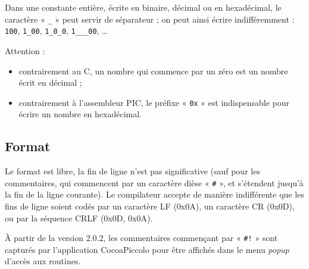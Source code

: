Dans une constante entière, écrite en binaire, décimal ou en hexadécimal, le caractère « \texttt{\_} » peut servir de séparateur ; on peut ainsi écrire indifféremment : \texttt{100}, \texttt{1\_00}, \texttt{1\_0\_0}, \texttt{1\_\_\_00}, \dots

Attention :
\begin{itemize}
  \item contrairement au C, un nombre qui commence par un zéro est un nombre écrit en décimal ;
  \item contrairement à l’assembleur PIC, le préfixe « \texttt{0x} » est indispensable pour écrire un nombre en hexadécimal.
\end{itemize}

\subsection{Format}

Le format est libre, la fin de ligne n’est pas significative (sauf pour les commentaires, qui commencent par un caractère dièse « \texttt{\#} », et s’étendent jusqu’à la fin de la ligne courante). Le compilateur accepte de manière indifférente que les fins de ligne soient codés par un caractère LF (0x0A), un caractère CR (0x0D), ou par la séquence CRLF (0x0D, 0x0A).

À partir de la version 2.0.2, les commentaires commençant par « \texttt{\#!} » sont capturés par l'application CocoaPiccolo pour être affichés dans le menu \emph{popup} d'accès aux routines.

